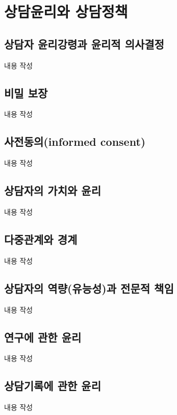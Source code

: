 \section{상담윤리와 상담정책}

\subsection{상담자 윤리강령과 윤리적 의사결정}
내용 작성

\subsection{비밀 보장}
내용 작성

\subsection{사전동의(informed consent)}
내용 작성

\subsection{상담자의 가치와 윤리}
내용 작성

\subsection{다중관계와 경계}
내용 작성

\subsection{상담자의 역량(유능성)과 전문적 책임}
내용 작성

\subsection{연구에 관한 윤리}
내용 작성

\subsection{상담기록에 관한 윤리}
내용 작성
